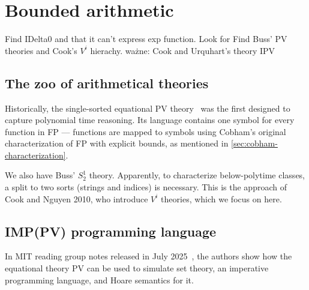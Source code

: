 \chapter{Bounded arithmetic}
\label{chap:bounded-arithmetic}

 Find IDelta0 and that it can't express exp function. Look for
 Find Buss' PV theories and Cook's $V^i$ hierachy.
 ważne: Cook and Urquhart's theory IPV

\section{The zoo of arithmetical theories}
Historically, the single-sorted equational PV theory~\cite{10.1145/800116.803756} was
the first designed to capture polynomial time reasoning.
Its language contains one symbol for every function in FP --- functions are mapped to symbols
using Cobham's original characterization of FP with explicit bounds, as mentioned in \ref{sec:cobham-characterization}.

We also have Buss' $S^1_2$ theory. Apparently, to characterize below-polytime classes, a split to two sorts (strings and indices)
is necessary. This is the approach of Cook and Nguyen 2010, who introduce $V^i$ theories, which we focus on here.



\section{IMP(PV) programming language}
In MIT reading group notes released in July 2025~\cite{Li2025FeasibleMathematics}, the authors show how the equational theory PV
can be used to simulate set theory, an imperative programming language, and Hoare semantics for it.

